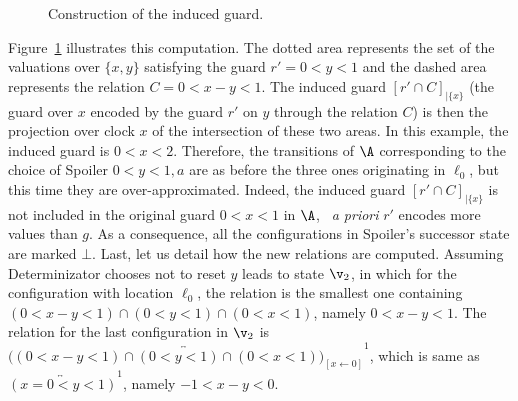 \documentclass{LMCS}
\theoremstyle{plain}\newtheorem{proposition}[thm]{Proposition}
\begin{document}
\begin{exa}
\begin{figure}[htbp]
\begin{center}
{}\caption{Construction of the induced guard.
}\label{fig:ind-guard}
\end{center}
\end{figure}
Figure~\ref{fig:ind-guard} illustrates this computation.  The dotted
area represents the set of the valuations over $\{x,y\}$ satisfying
the guard $r'=0<y<1$ and the dashed area represents the relation
$C=0<x-y<1$. The induced guard $[r'\cap C]_{|\{x\}}$ (\ie the guard
over $x$ encoded by the guard $r'$ on $y$ through the relation $C$) is
then the projection over clock $x$ of the intersection of these two
areas. In this example, the induced guard is $0<x<2$. Therefore, the
transitions of $\A$ corresponding to the choice of Spoiler $0<y<1, a$
are as before the three ones originating in $\ell_0$, but this time they
are over-approximated. Indeed, the induced guard $[r'\cap C]_{|\{x\}}$
is not included in the original guard $0<x<1$ in $\A$, \ie~{\em a priori}
$r'$ encodes more values than $g$.  As a consequence, all the
configurations in Spoiler's successor state are marked $\bot$.
Last, let us detail how the new relations are computed.
Assuming Determinizator chooses not to reset $y$ leads to state $\v_2$,
in which for the configuration with location $\ell_0$, the relation is
the smallest one containing $(0<x-y<1)\cap(0<y<1)\cap(0<x<1)$, namely
$0<x-y<1$. The relation for the last configuration in $\v_2$ is
$\overleftrightarrow{\bigl((0<x-y<1)\cap (0<y<1) \cap
  (0<x<1)\bigr)_{[x \leftarrow 0]}}^1$, which is same as
$\overleftrightarrow{(x=0 <y<1)}^1$, namely $-1 < x-y <0 $.

\end{exa}
\end{document}
